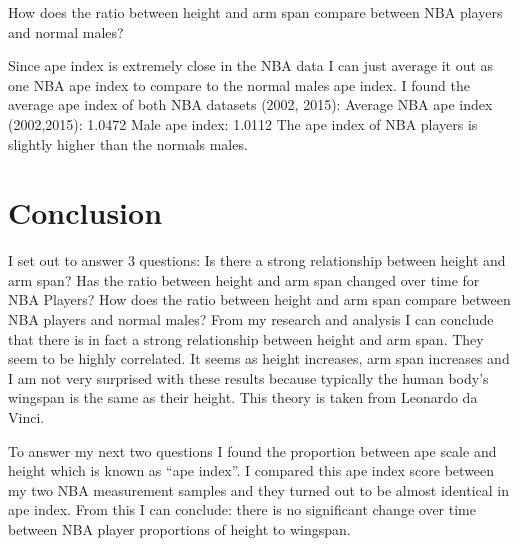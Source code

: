 \documentclass[]{article}
\begin{document}
\vspace{5mm}

\noindent How does the ratio between height and arm span compare between
NBA players and normal males? \newline

\noindent Since ape index is extremely close in the NBA data I can just
average it out as one NBA ape index to compare to the normal males ape
index. \newline \noindent I found the average ape index of both NBA
datasets (2002, 2015): \newline \noindent Average NBA ape index
(2002,2015): 1.0472 \newline \noindent Male ape index: 1.0112 \newline
\noindent The ape index of NBA players is slightly higher than the
normals males.

\newpage
\section{Conclusion}
\label{sec:conclusion}

\noindent I set out to answer 3 questions: \newline \noindent Is there a
strong relationship between height and arm span? \newline \noindent Has
the ratio between height and arm span changed over time for NBA Players?
\newline \noindent How does the ratio between height and arm span
compare between NBA players and normal males? \newline \newline
\indent From my research and analysis I can conclude that there is in
fact a strong relationship between height and arm span. They seem to be
highly correlated. It seems as height increases, arm span increases and
I am not very surprised with these results because typically the human
body's wingspan is the same as their height. This theory is taken from
Leonardo da Vinci. \vspace{5mm}

To answer my next two questions I found the proportion between ape scale
and height which is known as ``ape index''. I compared this ape index
score between my two NBA measurement samples and they turned out to be
almost identical in ape index. From this I can conclude: there is no
significant change over time between NBA player proportions of height to
wingspan. \vspace{5mm}
\end{document}
